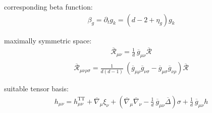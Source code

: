 corresponding beta function:
\begin{align}
	\beta_g = \partial_t g_k = \left(d-2 + \eta_g\right)g_k
\end{align}

maximally symmetric space:
\begin{align}
	\overline{\mathcal{R}}_{\mu\nu} = \frac{1}{d} \ \overline{g}_{\mu\nu} \overline{\mathcal{R}}
\end{align}
\begin{align}
	\overline{\mathcal{R}}_{\mu\nu\rho\sigma} = \frac{1}{d(d-1)} \ (\overline{g}_{\mu\rho}\overline{g}_{\nu\sigma} - \overline{g}_{\mu\sigma}\overline{g}_{\nu\rho}) \overline{\mathcal{R}}
\end{align}

suitable tensor basis:
\begin{align}
	h_{\mu\nu} = h_{\mu\nu}^{\text{TT}} + \overline{\nabla}_{\mu}\xi_{\nu} + \left(\overline{\nabla}_{\mu}\overline{\nabla}_{\nu} - \frac{1}{d} \ \overline{g}_{\mu\nu}\overline{\Delta}\right)\sigma + \frac{1}{d} \ \overline{g}_{\mu\nu}h
\end{align}
